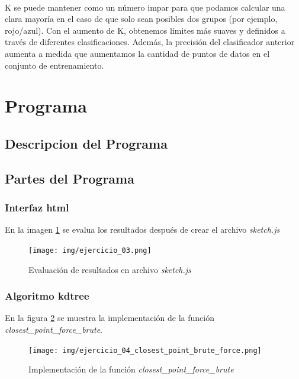 \documentclass{article}
\begin{document}
\paragraph{}
K se puede mantener como un número impar para que podamos calcular una clara mayoría en el caso de que solo sean posibles dos grupos (por ejemplo, rojo/azul). Con el aumento de K, obtenemos límites más suaves y definidos a través de diferentes clasificaciones. Además, la precisión del clasificador anterior aumenta a medida que aumentamos la cantidad de puntos de datos en el conjunto de entrenamiento.

\clearpage
\section{Programa}

\subsection{Descripcion del Programa}
\paragraph{}

\clearpage
\subsection{Partes del Programa}
\subsubsection{Interfaz html}
En la imagen \ref{fig:ejercicio_03} se evalua los resultados después de crear el archivo \textit{sketch.js}

\begin{figure}[h!]
	\centering
	\texttt{[image: img/ejercicio\_03.png]}
	\caption{Evaluación de resultados en archivo \textit{sketch.js}}
	\label{fig:ejercicio_03}
\end{figure}

\clearpage
\subsubsection{Algoritmo kdtree}
En la figura \ref{fig:ejercicio_04_closest_point_brute_force} se muestra la implementación de la función \textit{closest\_point\_force\_brute}.

\begin{figure}[h!]
	\centering
	\texttt{[image: img/ejercicio\_04\_closest\_point\_brute\_force.png]}
	\caption{Implementación de la función \textit{closest\_point\_force\_brute}}
	\label{fig:ejercicio_04_closest_point_brute_force}
\end{figure}
\end{document}
